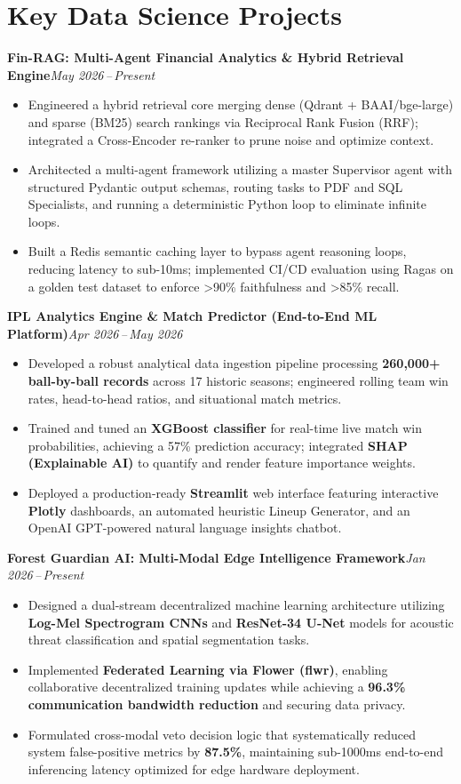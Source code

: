 \documentclass[9.5pt,a4paper]{article}
\newcommand{\proj}[2]{%
  \vspace{1.5pt}\noindent\textbf{#1}\hfill\textit{\small#2}\vspace{0.2pt}%
}
\begin{document}
\section{Key Data Science Projects}

\proj{Fin-RAG: Multi-Agent Financial Analytics \& Hybrid Retrieval Engine}{May 2026\,--\,Present}
\begin{itemize}
  \item Engineered a hybrid retrieval core merging dense (Qdrant + BAAI/bge-large) and sparse (BM25) search rankings via Reciprocal Rank Fusion (RRF); integrated a Cross-Encoder re-ranker to prune noise and optimize context.
  \item Architected a multi-agent framework utilizing a master Supervisor agent with structured Pydantic output schemas, routing tasks to PDF and SQL Specialists, and running a deterministic Python loop to eliminate infinite loops.
  \item Built a Redis semantic caching layer to bypass agent reasoning loops, reducing latency to sub-10ms; implemented CI/CD evaluation using Ragas on a golden test dataset to enforce >90\% faithfulness and >85\% recall.
\end{itemize}

\proj{IPL Analytics Engine \& Match Predictor (End-to-End ML Platform)}{Apr 2026\,--\,May 2026}
\begin{itemize}
  \item Developed a robust analytical data ingestion pipeline processing \textbf{260,000+ ball-by-ball records} across 17 historic seasons; engineered rolling team win rates, head-to-head ratios, and situational match metrics.
  \item Trained and tuned an \textbf{XGBoost classifier} for real-time live match win probabilities, achieving a 57\% prediction accuracy; integrated \textbf{SHAP (Explainable AI)} to quantify and render feature importance weights.
  \item Deployed a production-ready \textbf{Streamlit} web interface featuring interactive \textbf{Plotly} dashboards, an automated heuristic Lineup Generator, and an OpenAI GPT-powered natural language insights chatbot.
\end{itemize}

\proj{Forest Guardian AI: Multi-Modal Edge Intelligence Framework}{Jan 2026\,--\,Present}
\begin{itemize}
  \item Designed a dual-stream decentralized machine learning architecture utilizing \textbf{Log-Mel Spectrogram CNNs} and \textbf{ResNet-34 U-Net} models for acoustic threat classification and spatial segmentation tasks.
  \item Implemented \textbf{Federated Learning via Flower (flwr)}, enabling collaborative decentralized training updates while achieving a \textbf{96.3\% communication bandwidth reduction} and securing data privacy.
  \item Formulated cross-modal veto decision logic that systematically reduced system false-positive metrics by \textbf{87.5\%}, maintaining sub-1000ms end-to-end inferencing latency optimized for edge hardware deployment.
\end{itemize}
\end{document}
